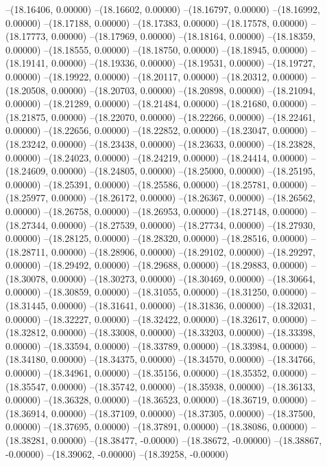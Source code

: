 --(18.16406, 0.00000)
--(18.16602, 0.00000)
--(18.16797, 0.00000)
--(18.16992, 0.00000)
--(18.17188, 0.00000)
--(18.17383, 0.00000)
--(18.17578, 0.00000)
--(18.17773, 0.00000)
--(18.17969, 0.00000)
--(18.18164, 0.00000)
--(18.18359, 0.00000)
--(18.18555, 0.00000)
--(18.18750, 0.00000)
--(18.18945, 0.00000)
--(18.19141, 0.00000)
--(18.19336, 0.00000)
--(18.19531, 0.00000)
--(18.19727, 0.00000)
--(18.19922, 0.00000)
--(18.20117, 0.00000)
--(18.20312, 0.00000)
--(18.20508, 0.00000)
--(18.20703, 0.00000)
--(18.20898, 0.00000)
--(18.21094, 0.00000)
--(18.21289, 0.00000)
--(18.21484, 0.00000)
--(18.21680, 0.00000)
--(18.21875, 0.00000)
--(18.22070, 0.00000)
--(18.22266, 0.00000)
--(18.22461, 0.00000)
--(18.22656, 0.00000)
--(18.22852, 0.00000)
--(18.23047, 0.00000)
--(18.23242, 0.00000)
--(18.23438, 0.00000)
--(18.23633, 0.00000)
--(18.23828, 0.00000)
--(18.24023, 0.00000)
--(18.24219, 0.00000)
--(18.24414, 0.00000)
--(18.24609, 0.00000)
--(18.24805, 0.00000)
--(18.25000, 0.00000)
--(18.25195, 0.00000)
--(18.25391, 0.00000)
--(18.25586, 0.00000)
--(18.25781, 0.00000)
--(18.25977, 0.00000)
--(18.26172, 0.00000)
--(18.26367, 0.00000)
--(18.26562, 0.00000)
--(18.26758, 0.00000)
--(18.26953, 0.00000)
--(18.27148, 0.00000)
--(18.27344, 0.00000)
--(18.27539, 0.00000)
--(18.27734, 0.00000)
--(18.27930, 0.00000)
--(18.28125, 0.00000)
--(18.28320, 0.00000)
--(18.28516, 0.00000)
--(18.28711, 0.00000)
--(18.28906, 0.00000)
--(18.29102, 0.00000)
--(18.29297, 0.00000)
--(18.29492, 0.00000)
--(18.29688, 0.00000)
--(18.29883, 0.00000)
--(18.30078, 0.00000)
--(18.30273, 0.00000)
--(18.30469, 0.00000)
--(18.30664, 0.00000)
--(18.30859, 0.00000)
--(18.31055, 0.00000)
--(18.31250, 0.00000)
--(18.31445, 0.00000)
--(18.31641, 0.00000)
--(18.31836, 0.00000)
--(18.32031, 0.00000)
--(18.32227, 0.00000)
--(18.32422, 0.00000)
--(18.32617, 0.00000)
--(18.32812, 0.00000)
--(18.33008, 0.00000)
--(18.33203, 0.00000)
--(18.33398, 0.00000)
--(18.33594, 0.00000)
--(18.33789, 0.00000)
--(18.33984, 0.00000)
--(18.34180, 0.00000)
--(18.34375, 0.00000)
--(18.34570, 0.00000)
--(18.34766, 0.00000)
--(18.34961, 0.00000)
--(18.35156, 0.00000)
--(18.35352, 0.00000)
--(18.35547, 0.00000)
--(18.35742, 0.00000)
--(18.35938, 0.00000)
--(18.36133, 0.00000)
--(18.36328, 0.00000)
--(18.36523, 0.00000)
--(18.36719, 0.00000)
--(18.36914, 0.00000)
--(18.37109, 0.00000)
--(18.37305, 0.00000)
--(18.37500, 0.00000)
--(18.37695, 0.00000)
--(18.37891, 0.00000)
--(18.38086, 0.00000)
--(18.38281, 0.00000)
--(18.38477, -0.00000)
--(18.38672, -0.00000)
--(18.38867, -0.00000)
--(18.39062, -0.00000)
--(18.39258, -0.00000)
